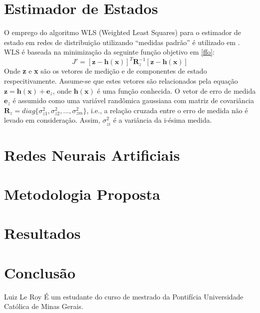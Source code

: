 \documentclass{IEEEtran}
\begin{document}
\section{Estimador de Estados}
O emprego do algoritmo WLS (Weighted Least Squares) para o estimador de estado em redes de distribuição utilizando ``medidas padrão'' é utilizado em \cite{singh2009choice}. WLS é baseada na minimização da seguinte função objetivo em \ref{ffo}:
\begin{equation} \label{ffo}
J'=[\textbf{z}-\textbf{h}(\textbf{x})]^T\textbf{R}_z^{-1}[\textbf{z}-\textbf{h}(\textbf{x})]  
\end{equation}
Onde \textbf{z} e \textbf{x} são os vetores de medição e de componentes de estado respecitivamente. Assume-se que estes vetores são relacionados pela equação $\textbf{z}=\textbf{h}(\textbf{x})+\textbf{e}_z$, onde $\textbf{h}(\textbf{x})$ é uma função conhecida. O vetor de erro de medida $\textbf{e}_z$ é assumido como uma variável randômica gaussiana com matriz de covariância $\textbf{R}_z=diag\{\sigma^2_{z1},\sigma^2_{z2}, ...,\sigma^2_{zm}\}$, i.e., a relação cruzada entre o erro de medida \cite{caro2009power} não é levado em consideração. Assim, $\sigma^2_{zi}$ é a variância da i-ésima medida.

\section{Redes Neurais Artificiais}

\section{Metodologia Proposta}

\section{Resultados}

\section{Conclusão}


\ifCLASSOPTIONcaptionsoff
  \newpage
\fi




\begin{IEEEbiographynophoto}{Luiz Le Roy}
\'E um estudante do curso de mestrado da Pontif\'icia Universidade Cat\'olica de Minas Gerais.
\end{IEEEbiographynophoto}

\end{document}
